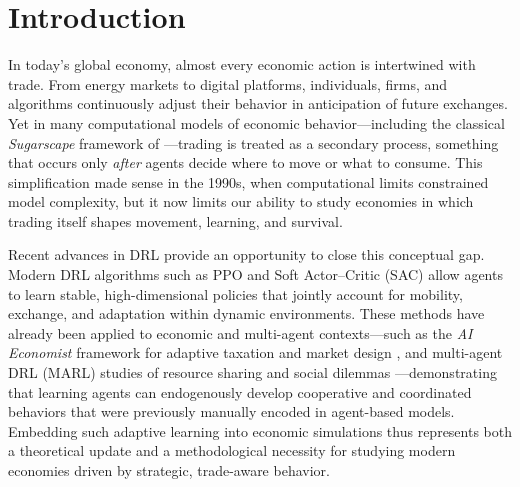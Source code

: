 \documentclass[pdflatex,sn-mathphys-num]{sn-jnl}%
\theoremstyle{thmstyleone}%
\theoremstyle{thmstyletwo}%
\theoremstyle{thmstylethree}%
\begin{document}



\maketitle

\section{Introduction}\label{sec1}

In today's global economy, almost every economic action is intertwined with trade.  
From energy markets to digital platforms, individuals, firms, and algorithms continuously adjust their behavior in anticipation of future exchanges.  
Yet in many computational models of economic behavior---including the classical \textit{Sugarscape} framework of \citet{EpsteinAxtell1996}---trading is treated as a secondary process, something that occurs only \emph{after} agents decide where to move or what to consume.  
This simplification made sense in the 1990s, when computational limits constrained model complexity, but it now limits our ability to study economies in which trading itself shapes movement, learning, and survival.

Recent advances in DRL provide an opportunity to close this conceptual gap.  
Modern DRL algorithms such as PPO \citep{Schulman2017} and Soft Actor--Critic (SAC) \citep{Haarnoja2018} allow agents to learn stable, high-dimensional policies that jointly account for mobility, exchange, and adaptation within dynamic environments.  
These methods have already been applied to economic and multi-agent contexts---such as the \textit{AI Economist} framework for adaptive taxation and market design \citep{Zheng2022}, and multi-agent DRL (MARL) studies of resource sharing and social dilemmas \citep{Leibo2017, Hughes2018}---demonstrating that learning agents can endogenously develop cooperative and coordinated behaviors that were previously manually encoded in agent-based models.  
Embedding such adaptive learning into economic simulations thus represents both a theoretical update and a methodological necessity for studying modern economies driven by strategic, trade-aware behavior.
\end{document}
